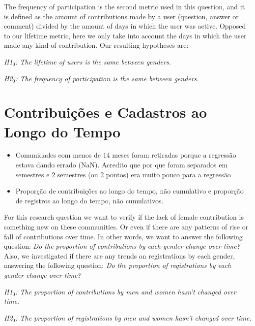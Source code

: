 The frequency of participation is the second metric used in this question, and it is defined as the amount of contributions made by a user (question, answer or comment) divided by the amount of days in which the user was active. Opposed to our lifetime metric, here we only take into account the days in which the user made any kind of contribution. Our resulting hypotheses are:

\textit{H1$_0$: The lifetime of users is the same between genders.}

\textit{H2$_0$: The frequency of participation is the same between genders.}


\section{Contribuições e Cadastros ao Longo do Tempo} %
\label{sub:contribui_es_e_cadastros_ao_longo_do_tempo}

\begin{itemize}
	\item Comunidades com menos de 14 meses foram retiradas porque a regressão estava dando errado (NaN). Acredito que por que foram separados em semestres e 2 semestres (ou 2 pontos) era muito pouco para a regressão
	\item Proporção de contribuições ao longo do tempo, não cumulativo e proporção de registros ao longo do tempo, não cumulativos.
\end{itemize}

For this research question we want to verify if the lack of female contribution is something new on these communities. Or even if there are any patterns of rise or fall of contributions over time. In other words, we want to answer the following question: \textit{Do the proportion of contributions by each gender change over time?} Also, we investigated if there are any trends on registrations by each gender, answering the following question: \textit{Do the proportion of registrations by each gender change over time?}

\textit{H1$_0$: The proportion of contributions by men and women hasn't changed over time.}

\textit{H2$_0$: The proportion of registrations by men and women hasn't changed over time.}

